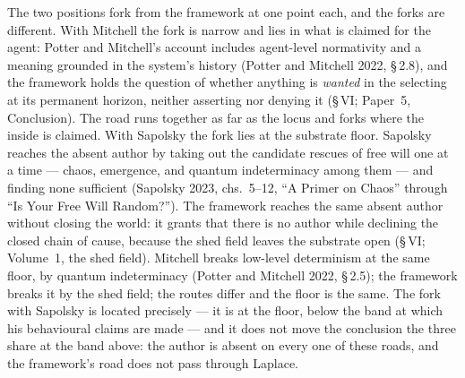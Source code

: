 \documentclass[11pt,oneside]{report}
\theoremstyle{definition}
\theoremstyle{remark}
\begin{document}
The two positions fork from the framework at one point each, and the forks are different. With Mitchell the fork is narrow and lies in what is claimed for the agent: Potter and Mitchell's account includes agent-level normativity and a meaning grounded in the system's history (Potter and Mitchell 2022, \S\,2.8), and the framework holds the question of whether anything is \emph{wanted} in the selecting at its permanent horizon, neither asserting nor denying it (\S\,VI; Paper~5, Conclusion). The road runs together as far as the locus and forks where the inside is claimed. With Sapolsky the fork lies at the substrate floor. Sapolsky reaches the absent author by taking out the candidate rescues of free will one at a time --- chaos, emergence, and quantum indeterminacy among them --- and finding none sufficient (Sapolsky 2023, chs.~5--12, ``A Primer on Chaos'' through ``Is Your Free Will Random?''). The framework reaches the same absent author without closing the world: it grants that there is no author while declining the closed chain of cause, because the shed field leaves the substrate open (\S\,VI; Volume~1, the shed field). Mitchell breaks low-level determinism at the same floor, by quantum indeterminacy (Potter and Mitchell 2022, \S\,2.5); the framework breaks it by the shed field; the routes differ and the floor is the same. The fork with Sapolsky is located precisely --- it is at the floor, below the band at which his behavioural claims are made --- and it does not move the conclusion the three share at the band above: the author is absent on every one of these roads, and the framework's road does not pass through Laplace.
\end{document}
